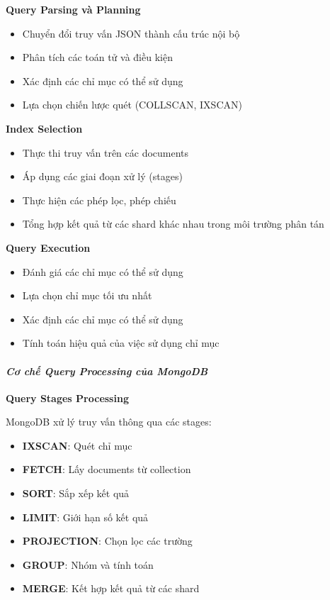 \textbf{Query Parsing và Planning}

\begin{itemize}
    \item Chuyển đổi truy vấn JSON thành cấu trúc nội bộ
    \item Phân tích các toán tử và điều kiện
    \item Xác định các chỉ mục có thể sử dụng
    \item Lựa chọn chiến lược quét (COLLSCAN, IXSCAN)
\end{itemize}

\textbf{Index Selection}

\begin{itemize}
    \item Thực thi truy vấn trên các documents
    \item Áp dụng các giai đoạn xử lý (stages)
    \item Thực hiện các phép lọc, phép chiếu
    \item Tổng hợp kết quả từ các shard khác nhau trong môi trường phân tán
\end{itemize}

\textbf{Query Execution}

\begin{itemize}
    \item Đánh giá các chỉ mục có thể sử dụng
    \item Lựa chọn chỉ mục tối ưu nhất
    \item Xác định các chỉ mục có thể sử dụng
    \item Tính toán hiệu quả của việc sử dụng chỉ mục
\end{itemize}

\paragraph{\textbf{\textit{Cơ chế Query Processing của MongoDB}}}

\textbf{}

\textbf{Query Stages Processing}

MongoDB xử lý truy vấn thông qua các stages:

\begin{itemize}
    \item \textbf{IXSCAN}: Quét chỉ mục
    \item \textbf{FETCH}: Lấy documents từ collection
    \item \textbf{SORT}: Sắp xếp kết quả
    \item \textbf{LIMIT}: Giới hạn số kết quả
    \item \textbf{PROJECTION}: Chọn lọc các trường
    \item \textbf{GROUP}: Nhóm và tính toán
    \item \textbf{MERGE}: Kết hợp kết quả từ các shard
\end{itemize}


